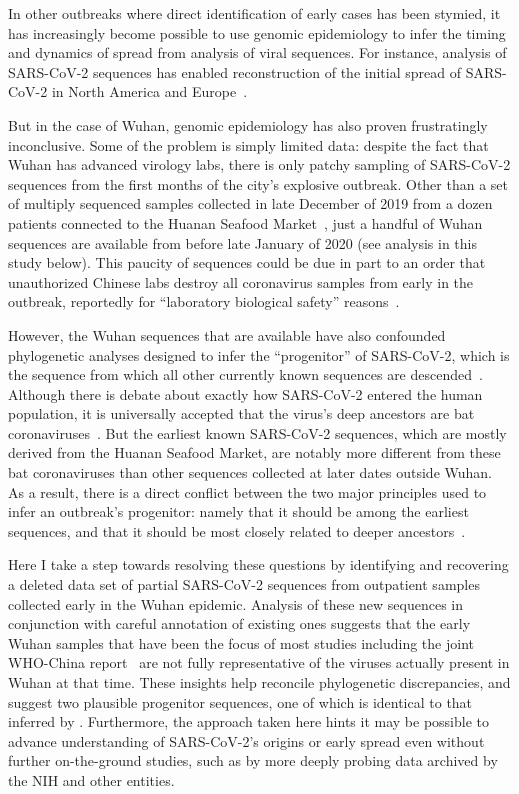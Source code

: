 \documentclass[9pt,twocolumn,twoside]{gsajnl_modified}
\begin{document}
In other outbreaks where direct identification of early cases has been stymied, it has increasingly become possible to use genomic epidemiology to infer the timing and dynamics of spread from analysis of viral sequences.
For instance, analysis of SARS-CoV-2 sequences has enabled reconstruction of the initial spread of SARS-CoV-2 in North America and Europe~\citep{bedford2020cryptic, worobey2020emergence, deng2020genomic, fauver2020coast}.

But in the case of Wuhan, genomic epidemiology has also proven frustratingly inconclusive.
Some of the problem is simply limited data: despite the fact that Wuhan has advanced virology labs, there is only patchy sampling of SARS-CoV-2 sequences from the first months of the city's explosive outbreak.
Other than a set of multiply sequenced samples collected in late December of 2019 from a dozen patients connected to the Huanan Seafood Market~\citep{WHO2021origins}, just a handful of Wuhan sequences are available from before late January of 2020 (see analysis in this study below).
This paucity of sequences could be due in part to an order that unauthorized Chinese labs destroy all coronavirus samples from early in the outbreak, reportedly for ``laboratory biological safety'' reasons~\citep{pinghui2020SCMP}.

However, the Wuhan sequences that are available have also confounded phylogenetic analyses designed to infer the ``progenitor'' of SARS-CoV-2, which is the sequence from which all other currently known sequences are descended~\citep{kumar2021evolutionary}.
Although there is debate about exactly how SARS-CoV-2 entered the human population, it is universally accepted that the virus's deep ancestors are bat coronaviruses~\citep{lytras2021exploring}.
But the earliest known SARS-CoV-2 sequences, which are mostly derived from the Huanan Seafood Market, are notably more different from these bat coronaviruses than other sequences collected at later dates outside Wuhan.
As a result, there is a direct conflict between the two major principles used to infer an outbreak's progenitor: namely that it should be among the earliest sequences, and that it should be most closely related to deeper ancestors~\citep{pipes2021assessing}.

Here I take a step towards resolving these questions by identifying and recovering a deleted data set of partial SARS-CoV-2 sequences from outpatient samples collected early in the Wuhan epidemic.
Analysis of these new sequences in conjunction with careful annotation of existing ones suggests that the early Wuhan samples that have been the focus of most studies including the joint WHO-China report~\citep{WHO2021origins} are not fully representative of the viruses actually present in Wuhan at that time.
These insights help reconcile phylogenetic discrepancies, and suggest two plausible progenitor sequences, one of which is identical to that inferred by \citet{kumar2021evolutionary}.
Furthermore, the approach taken here hints it may be possible to advance understanding of SARS-CoV-2's origins or early spread even without further on-the-ground studies, such as by more deeply probing data archived by the NIH and other entities.
\end{document}
